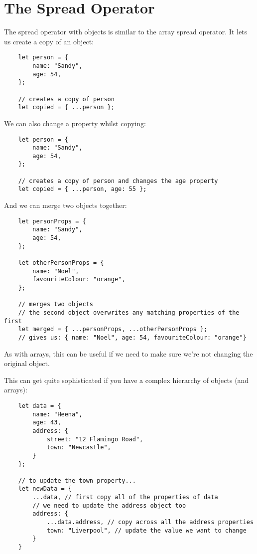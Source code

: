 \section{The Spread Operator}

The spread operator with objects is similar to the array spread operator. It lets us create a copy of an object:

\begin{verbatim}
    let person = {
        name: "Sandy",
        age: 54,
    };

    // creates a copy of person
    let copied = { ...person };
\end{verbatim}

\pagebreak

We can also change a property whilst copying:

\begin{verbatim}
    let person = {
        name: "Sandy",
        age: 54,
    };

    // creates a copy of person and changes the age property
    let copied = { ...person, age: 55 };
\end{verbatim}

And we can merge two objects together:

\begin{verbatim}
    let personProps = {
        name: "Sandy",
        age: 54,
    };

    let otherPersonProps = {
        name: "Noel",
        favouriteColour: "orange",
    };

    // merges two objects
    // the second object overwrites any matching properties of the first
    let merged = { ...personProps, ...otherPersonProps };
    // gives us: { name: "Noel", age: 54, favouriteColour: "orange"}
\end{verbatim}

As with arrays, this can be useful if we need to make sure we're not changing the original object.

\pagebreak

This can get quite sophisticated if you have a complex hierarchy of objects (and arrays):

\begin{verbatim}
    let data = {
        name: "Heena",
        age: 43,
        address: {
            street: "12 Flamingo Road",
            town: "Newcastle",
        }
    };

    // to update the town property...
    let newData = {
        ...data, // first copy all of the properties of data
        // we need to update the address object too
        address: {
            ...data.address, // copy across all the address properties
            town: "Liverpool", // update the value we want to change
        }
    }
\end{verbatim}



